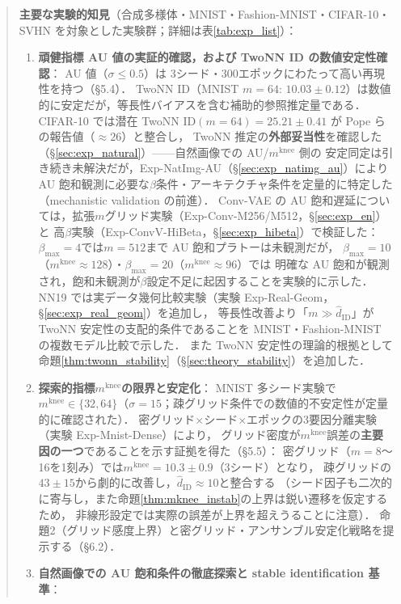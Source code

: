 \documentclass[11pt,a4paper]{jsarticle}
\newcommand{\mknee}{m^{\mathrm{knee}}}
\begin{document}
\begin{abstract}
\textbf{主要な実験的知見}（合成多様体・MNIST・Fashion-MNIST・CIFAR-10・SVHN を対象とした実験群；詳細は表\ref{tab:exp_list}）：
\begin{enumerate}
  \item \textbf{頑健指標 AU 値の実証的確認，および TwoNN ID の数値安定性確認}：
        AU 値（$\sigma \leq 0.5$）は 3シード・300エポックにわたって高い再現性を持つ（§5.4）．
        TwoNN ID（MNIST $m=64$: $10.03 \pm 0.12$）は数値的に安定だが，等長性バイアスを含む補助的参照推定量である．
        CIFAR-10 では潜在 TwoNN ID$(m=64)=25.21\pm0.41$ が Pope らの報告値（$\approx26$）と整合し，
        TwoNN 推定の\textbf{外部妥当性}を確認した（§\ref{sec:exp_natural}）——自然画像での AU/$\mknee$ 側の
        安定同定は引き続き未解決だが，Exp-NatImg-AU（§\ref{sec:exp_natimg_au}）により
        AU 飽和観測に必要な$\beta$条件・アーキテクチャ条件を定量的に特定した（mechanistic validation の前進）．
        Conv-VAE の AU 飽和遅延については，拡張$m$グリッド実験（Exp-Conv-M256/M512，§\ref{sec:exp_en}）と
        高$\beta$実験（Exp-ConvV-HiBeta，§\ref{sec:exp_hibeta}）で検証した：
        $\beta_{\max}=4$では$m=512$まで AU 飽和プラトーは未観測だが，
        $\beta_{\max}=10$（$\mknee \approx 128$）・$\beta_{\max}=20$（$\mknee \approx 96$）では
        明確な AU 飽和が観測され，飽和未観測が$\beta$設定不足に起因することを実験的に示した．
        NN19 では実データ幾何比較実験（実験 Exp-Real-Geom，§\ref{sec:exp_real_geom}）を追加し，
        等長性改善より「$m \gg \hat{d}_\mathrm{ID}$」が TwoNN 安定性の支配的条件であることを
        MNIST・Fashion-MNIST の複数モデル比較で示した．
        また TwoNN 安定性の理論的根拠として命題\ref{thm:twonn_stability}（§\ref{sec:theory_stability}）を追加した．
  \item \textbf{探索的指標$\mknee$の限界と安定化}：
        MNIST 多シード実験で$\mknee \in \{32, 64\}$（$\sigma=15$；疎グリッド条件での数値的不安定性が定量的に確認された）．
        密グリッド×シード×エポックの3要因分離実験（実験 Exp-Mnist-Dense）により，
        グリッド密度が$\mknee$誤差の\textbf{主要因の一つ}であることを示す証拠を得た（§5.5）：
        密グリッド（$m=8$〜16を1刻み）では$\mknee = 10.3 \pm 0.9$（3シード）となり，
        疎グリッドの$43\pm15$から劇的に改善し，$\hat{d}_\mathrm{ID} \approx 10$と整合する
        （シード因子も二次的に寄与し，また命題\ref{thm:mknee_instab}の上界は鋭い遷移を仮定するため，
        非線形設定では実際の誤差が上界を超えうることに注意）．
        命題2（グリッド感度上界）と密グリッド・アンサンブル安定化戦略を提示する（§6.2）．
  \item \textbf{自然画像での AU 飽和条件の徹底探索と stable identification 基準}：

\end{enumerate}
\end{abstract}
\end{document}
